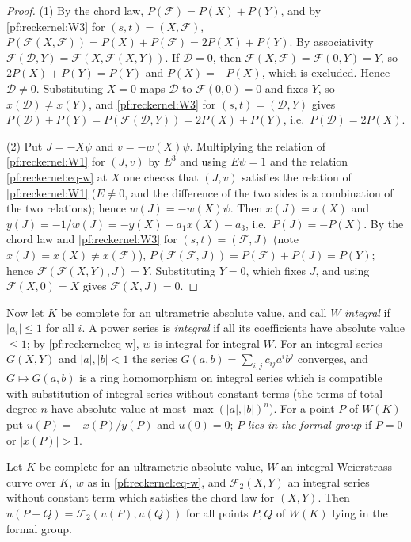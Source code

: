 \begin{proof}
(1) By the chord law, $P(\mathcal F)=P(X)+P(Y)$, and by \ref{pf:reckernel:W3} for $(s,t)=(X,\mathcal F)$,
$P(\mathcal F(X,\mathcal F))=P(X)+P(\mathcal F)=2P(X)+P(Y)$. By associativity
$\mathcal F(\mathcal D,Y)=\mathcal F(X,\mathcal F(X,Y))$. If $\mathcal D=0$, then $\mathcal F(X,\mathcal F)=\mathcal F(0,Y)=Y$,
so $2P(X)+P(Y)=P(Y)$ and $P(X)=-P(X)$, which is excluded. Hence $\mathcal D\ne0$. Substituting $X=0$ maps $\mathcal D$ to
$\mathcal F(0,0)=0$ and fixes $Y$, so $x(\mathcal D)\ne x(Y)$, and \ref{pf:reckernel:W3} for $(s,t)=(\mathcal D,Y)$ gives
$P(\mathcal D)+P(Y)=P(\mathcal F(\mathcal D,Y))=2P(X)+P(Y)$, i.e.\ $P(\mathcal D)=2P(X)$.

(2) Put $J=-X\psi$ and $v=-w(X)\psi$. Multiplying the relation of \ref{pf:reckernel:W1} for $(J,v)$ by $E^3$ and using
$E\psi=1$ and the relation \eqref{pf:reckernel:eq-w} at $X$ one checks that $(J,v)$ satisfies the relation of
\ref{pf:reckernel:W1} ($E\ne0$, and the difference of the two sides is a combination of the two relations); hence
$w(J)=-w(X)\psi$. Then $x(J)=x(X)$ and $y(J)=-1/w(J)=-y(X)-a_1x(X)-a_3$, i.e.\ $P(J)=-P(X)$. By the chord law and
\ref{pf:reckernel:W3} for $(s,t)=(\mathcal F,J)$ (note $x(J)=x(X)\ne x(\mathcal F)$),
$P(\mathcal F(\mathcal F,J))=P(\mathcal F)+P(J)=P(Y)$; hence $\mathcal F(\mathcal F(X,Y),J)=Y$. Substituting $Y=0$, which fixes
$J$, and using $\mathcal F(X,0)=X$ gives $\mathcal F(X,J)=0$.
\end{proof}

Now let $K$ be complete for an ultrametric absolute value, and call $W$ \emph{integral} if $|a_i|\le1$ for all $i$. A
power series is \emph{integral} if all its coefficients have absolute value $\le1$; by \eqref{pf:reckernel:eq-w}, $w$ is
integral for integral $W$. For an integral series $G(X,Y)$ and $|a|,|b|<1$ the series
$G(a,b)=\sum_{i,j}c_{ij}a^ib^j$ converges, and $G\mapsto G(a,b)$ is a ring homomorphism on integral series which is
compatible with substitution of integral series without constant terms (the terms of total degree $n$ have absolute value
at most $\max(|a|,|b|)^n$). For a point $P$ of $W(K)$ put $u(P)=-x(P)/y(P)$ and $u(0)=0$; $P$ \emph{lies in the formal
group} if $P=0$ or $|x(P)|>1$.

\begin{theorem}\label{pf:reckernel:fgHom}
Let $K$ be complete for an ultrametric absolute value, $W$ an integral Weierstrass curve over $K$, $w$ as in
\eqref{pf:reckernel:eq-w}, and $\mathcal F_2(X,Y)$ an integral series without constant term which satisfies the chord law
for $(X,Y)$. Then $u(P+Q)=\mathcal F_2(u(P),u(Q))$ for all points $P,Q$ of $W(K)$ lying in the formal group.
\end{theorem}


